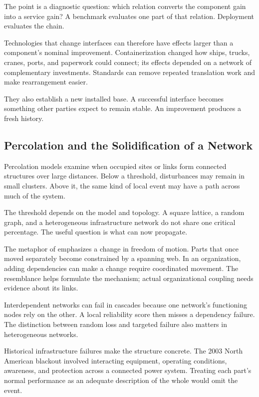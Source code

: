 The point is a diagnostic question: which relation converts the component gain into a service gain? A benchmark evaluates one part of that relation. Deployment evaluates the chain.

Technologies that change interfaces can therefore have effects larger than a component's nominal improvement. Containerization changed how ships, trucks, cranes, ports, and paperwork could connect; its effects depended on a network of complementary investments.\cite{bernhofen2016estimating} Standards can remove repeated translation work and make rearrangement easier.

They also establish a new installed base. A successful interface becomes something other parties expect to remain stable. An improvement produces a fresh history.

\subsection{Percolation and the Solidification of a Network}


Percolation models examine when occupied sites or links form connected structures over large distances.\cite{broadbent1957,erdos1959} Below a threshold, disturbances may remain in small clusters. Above it, the same kind of local event may have a path across much of the system.

The threshold depends on the model and topology. A square lattice, a random graph, and a heterogeneous infrastructure network do not share one critical percentage. The useful question is what can now propagate.

The metaphor of  emphasizes a change in freedom of motion. Parts that once moved separately become constrained by a spanning web. In an organization, adding dependencies can make a change require coordinated movement. The resemblance helps formulate the mechanism; actual organizational coupling needs evidence about its links.

Interdependent networks can fail in cascades because one network's functioning nodes rely on the other.\cite{buldyrev2010} A local reliability score then misses a dependency failure. The distinction between random loss and targeted failure also matters in heterogeneous networks.\cite{albert2000error}


Historical infrastructure failures make the structure concrete. The 2003 North American blackout involved interacting equipment, operating conditions, awareness, and protection across a connected power system.\cite{uscanada2004} Treating each part's normal performance as an adequate description of the whole would omit the event.

